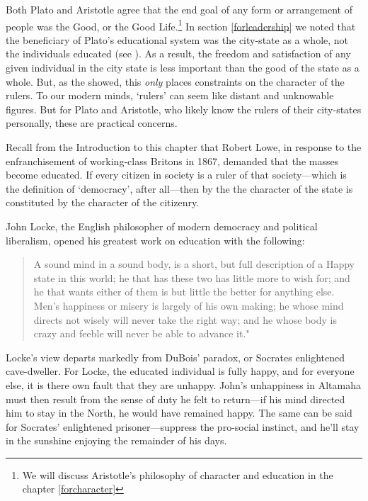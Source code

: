 Both Plato and Aristotle agree that the end goal of any form or arrangement of people was the Good, or the Good Life.\footnote{We will discuss Aristotle's philosophy of character and education in the chapter \ref{forcharacter}} In section \ref{forleadership} we noted that the beneficiary of Plato's educational system was the city-state as a whole, not the individuals educated (see ). As a result, the freedom and satisfaction of any given individual in the city state is less important than the good of the state as a whole. But, as the  showed, this \emph{only} places constraints on the character of the rulers. To our modern minds, `rulers' can seem like distant and unknowable figures. But for Plato and Aristotle, who likely know the rulers of their city-states personally, these are practical concerns.

Recall from the Introduction to this chapter that Robert Lowe, in response to the enfranchisement of working-class Britons in 1867, demanded that the masses become educated. If every citizen in society is a ruler of that society---which is the definition of `democracy', after all---then by the  the character of the state is constituted by the character of the citizenry.

John Locke, the English philosopher of modern democracy and political liberalism, opened his greatest work on education with the following:

\begin{quote}

A sound mind in a sound body, is a short, but full description of a Happy state in this world; he that has these two has little more to wish for; and he that wants either of them is but little the better for anything else. Men's happiness or misery is largely of his own making; he whose mind directs not wisely will never take the right way; and he whose body is crazy and feeble will never be able to advance it."~\citep[p. 1]{Locke:1693va}
\end{quote}

Locke's view departs markedly from DuBois' paradox, or Socrates enlightened cave-dweller. For Locke, the educated individual is fully happy, and for everyone else, it is there own fault that they are unhappy. John's unhappiness in Altamaha must then result from the sense of duty he felt to return---if his mind directed him to stay in the North, he would have remained happy. The same can be said for Socrates' enlightened prisoner---suppress the pro-social instinct, and he'll stay in the sunshine enjoying the remainder of his days.


